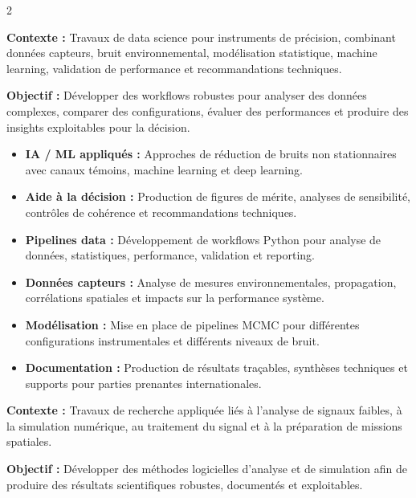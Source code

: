 \documentclass[8pt,a4paper,ragged2e,withhyper]{altacv}
\begin{document}
\begin{paracol}{2}

\textbf{Contexte :} Travaux de data science pour instruments de précision, combinant données capteurs, bruit environnemental, modélisation statistique, machine learning, validation de performance et recommandations techniques.

\textbf{Objectif :} Développer des workflows robustes pour analyser des données complexes, comparer des configurations, évaluer des performances et produire des insights exploitables pour la décision.

\begin{itemize}
  \item \textbf{IA / ML appliqués :} Approches de réduction de bruits non stationnaires avec canaux témoins, machine learning et deep learning.
  \item \textbf{Aide à la décision :} Production de figures de mérite, analyses de sensibilité, contrôles de cohérence et recommandations techniques.
  \item \textbf{Pipelines data :} Développement de workflows Python pour analyse de données, statistiques, performance, validation et reporting.
  \item \textbf{Données capteurs :} Analyse de mesures environnementales, propagation, corrélations spatiales et impacts sur la performance système.
  \item \textbf{Modélisation :} Mise en place de pipelines MCMC pour différentes configurations instrumentales et différents niveaux de bruit.
  \item \textbf{Documentation :} Production de résultats traçables, synthèses techniques et supports pour parties prenantes internationales.
\end{itemize}

\divider


\textbf{Contexte :} Travaux de recherche appliquée liés à l’analyse de signaux faibles, à la simulation numérique, au traitement du signal et à la préparation de missions spatiales.

\textbf{Objectif :} Développer des méthodes logicielles d’analyse et de simulation afin de produire des résultats scientifiques robustes, documentés et exploitables.


\end{paracol}
\end{document}
